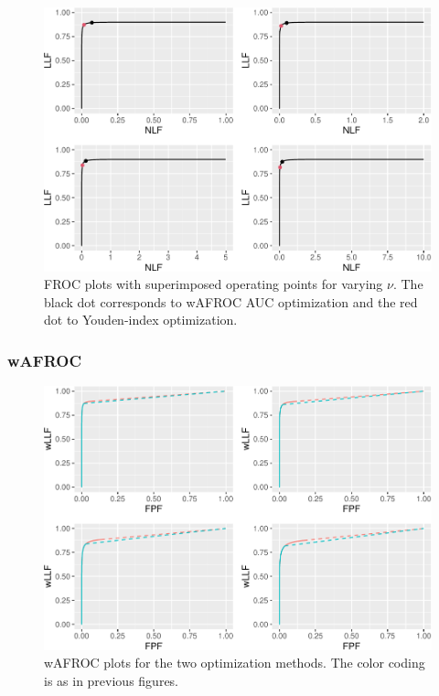 \documentclass[
]{book}
\begin{document}
\begin{figure}
\centering
\includegraphics{22-optim-op-point_files/figure-latex/optim-op-point-high-performance-vary-lambda-vary-all-froc-1.pdf}
\caption{\label{fig:optim-op-point-high-performance-vary-lambda-vary-all-froc}FROC plots with superimposed operating points for varying \(\nu\). The black dot corresponds to wAFROC AUC optimization and the red dot to Youden-index optimization.}
\end{figure}

\hypertarget{wafroc-7}{%
\subsubsection{wAFROC}\label{wafroc-7}}

\begin{figure}
\centering
\includegraphics{22-optim-op-point_files/figure-latex/optim-op-point-high-performance-vary-lambda-vary-all-wafroc-1.pdf}
\caption{\label{fig:optim-op-point-high-performance-vary-lambda-vary-all-wafroc}wAFROC plots for the two optimization methods. The color coding is as in previous figures.}
\end{figure}
\end{document}
